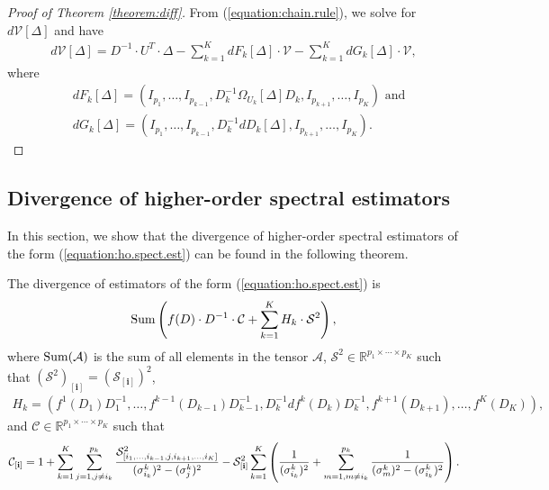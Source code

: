 \begin{proof}[Proof of Theorem \ref{theorem:diff}]
From (\ref{equation:chain.rule}), we solve for $d\mathcal{V}[\Delta]$ and have
\begin{align}
\label{equation:d.V}
d\mathcal{V}[\Delta] = D^{-1} \cdot U^T \cdot \Delta - \sum_{k=1}^K dF_k[\Delta]\cdot \mathcal{V} - \sum_{k=1}^K dG_k[\Delta] \cdot \mathcal{V},
\end{align}
where
\begin{align}
\label{equation:d.FG}
&dF_k[\Delta] = (I_{p_1},\ldots,I_{p_{k-1}},D_k^{-1}\Omega_{U_k}[\Delta]D_k,I_{p_{k+1}},\ldots,I_{p_K}) \text{ and}\\
&dG_k[\Delta] = (I_{p_1},\ldots,I_{p_{k-1}},D_k^{-1}dD_k[\Delta],I_{p_{k+1}},\ldots,I_{p_K}).
\end{align}
\end{proof}

\subsection{Divergence of higher-order spectral estimators}
\label{subsection:div}
In this section, we  show that the divergence of higher-order spectral estimators of the form (\ref{equation:ho.spect.est}) can be found in the following theorem.
\begin{theorem}
The divergence of estimators of the form (\ref{equation:ho.spect.est}) is
\begin{align}
\operatorname*{Sum}\left(f(D) \cdot D^{-1}\cdot \mathcal{C} + \sum_{k=1}^KH_k \cdot \mathcal{S}^2\right), \label{equation:divergence.final}
\end{align}
where $\operatorname*{Sum}(\mathcal{A})$ is the sum of all elements in the tensor $\mathcal{A}$,  $\mathcal{S}^2 \in \mathbb{R}^{p_1\times\cdots\times p_K}$ such that $(\mathcal{S}^2)_{[\mathbf{i}]} = (\mathcal{S}_{[\mathbf{i}]})^2$,
\begin{align}
\label{equation:H.k}
H_k = (f^1(D_1)D_1^{-1},\ldots,f^{k-1}(D_{k-1})D_{k-1}^{-1},D_{k}^{-1}df^k(D_k)D_k^{-1},f^{k+1}(D_{k+1}),\ldots,f^K(D_K)),
\end{align}
and $\mathcal{C} \in \mathbb{R}^{p_1\times\cdots\times p_K}$ such that
\begin{align}
\label{equation:C.array}
\mathcal{C}_{[{\bf i}]} =  1 + \sum_{k=1}^K \sum_{j = 1, j\neq i_k}^{p_k} \frac{\mathcal{S}_{[i_1,\ldots,i_{k-1},j,i_{k+1},\ldots,i_K]}^2}{(\sigma_{i_k}^k)^2 - (\sigma_{j}^k)^2} - \mathcal{S}_{\bf [i]}^2\sum_{k=1}^K\left( \frac{1}{(\sigma_{i_k}^k)^2} + \sum_{m=1,m\neq i_k}^{p_k}\frac{1}{(\sigma_m^k)^2 - (\sigma_{i_k}^k)^2}  \right).
\end{align}
\end{theorem}


